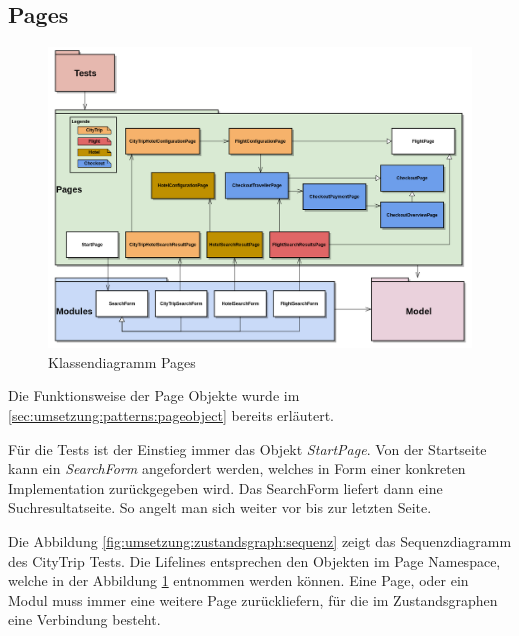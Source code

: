 \subsection{Pages}
\begin{figure}[H]
	\centering
	\includegraphics[width=1.0\textwidth]{images/semesterarbeit class diagram - pages.png}
	\caption{Klassendiagramm Pages}
	\label{fig:umsetzung:architektur:pages}
\end{figure}
Die Funktionsweise der Page Objekte wurde im \cref{sec:umsetzung:patterns:pageobject}  bereits erläutert.

Für die Tests ist der Einstieg immer das Objekt \textit{StartPage}. Von der Startseite kann ein \textit{SearchForm} angefordert werden, welches in Form einer konkreten Implementation zurückgegeben wird. Das SearchForm liefert dann eine Suchresultatseite. So angelt man sich weiter vor bis zur letzten Seite.


Die Abbildung \ref{fig:umsetzung:zustandsgraph:sequenz} zeigt das Sequenzdiagramm des CityTrip Tests. Die Lifelines entsprechen den Objekten im Page Namespace, welche in der Abbildung \ref{fig:umsetzung:architektur:pages} entnommen werden können. Eine Page, oder ein Modul muss immer eine weitere Page zurückliefern, für die im Zustandsgraphen eine Verbindung besteht.

